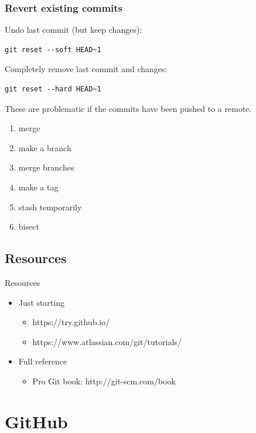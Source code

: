 \documentclass{beamer}
\begin{document}
\begin{frame}[fragile]
  \frametitle{Revert existing commits}
Undo last commit (but keep changes):
  \begin{lstlisting}
git reset --soft HEAD~1
  \end{lstlisting}
Completely remove last commit and changes:
  \begin{lstlisting}
git reset --hard HEAD~1
  \end{lstlisting}
These are problematic if the commits have been pushed to a remote.
\end{frame}

\begin{frame}
  \begin{enumerate}
    \item merge
    \item make a branch
    \item merge branches
    \item make a tag
    \item stash temporarily
    \item bisect
  \end{enumerate}
\end{frame}

\subsection{Resources}
\begin{frame}{Resources}
  \begin{itemize}
    \item Just starting
      \begin{itemize}
        \item https://try.github.io/
        \item https://www.atlassian.com/git/tutorials/
      \end{itemize}
    \item Full reference
      \begin{itemize}
        \item Pro Git book: http://git-scm.com/book
      \end{itemize}
  \end{itemize}
\end{frame}

\section{GitHub}
\subsection*{}
\end{document}
